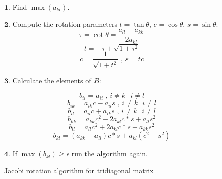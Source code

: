 \documentclass[11pt]{article}
\begin{document}
\begin{figure}[ht]\label{Jacobi rotation algorithm}
\begin{framed}
\begin{minipage}[b]{0.45\linewidth}

\begin{flushleft}
$\boldsymbol{1.}$ Find $\max (a_{kl})$.
\end{flushleft}

\begin{flushleft}
$\boldsymbol{2.}$ Compute the rotation parameters $t = \tan \theta$, $c = \cos \theta$, $s = \sin \theta$:
\begin{equation}
\tau = \cot \theta = \frac{a_{ll} - a_{kk}}{2 a_{kl}}
\end{equation}
\begin{equation}
t = - \tau \pm \sqrt{1 + \tau^2}
\end{equation}
\begin{equation}
c = \frac{1}{\sqrt{1 + t^2}} \text{ , } s = tc
\end{equation}
\end{flushleft}

\end{minipage}
\hspace{0.5cm}
\begin{minipage}[b]{0.45\linewidth}

\centering

\begin{flushleft}
$\boldsymbol{3.}$ Calculate the elements of $B$:

\begin{equation*}
b_{ii} = a_{ii} \text{ , } i \neq k \text{ } i \neq l
\end{equation*}
\begin{equation*}
b_{ik} = a_{ik} c - a_{il} s \text{ , } i \neq k \text{ } i \neq l
\end{equation*}
\begin{equation*}
b_{il} = a_{il} c + a_{ik} s \text{ , } i \neq k \text{ } i \neq l
\end{equation*}
\begin{equation*}
b_{kk} = a_{kk} c^2 - 2 a_{kl} c*s + a_{ll} s^2
\end{equation*}
\begin{equation*}
b_{ll} = a_{ll} c^2 + 2 a_{kl} c*s + a_{kk} s^2
\end{equation*}
\begin{equation*}
b_{kl} = (a_{kk} - a_{ll}) c*s + a_{kl}(c^2 - s^2)
\end{equation*}
\end{flushleft}

\begin{flushleft}
$\boldsymbol{4.}$ If $\max (b_{kl}) \geq \epsilon$ run the algorithm again.
\end{flushleft}

\end{minipage}
\end{framed}
\caption{Jacobi rotation algorithm for tridiagonal matrix}
\end{figure}
\end{document}
